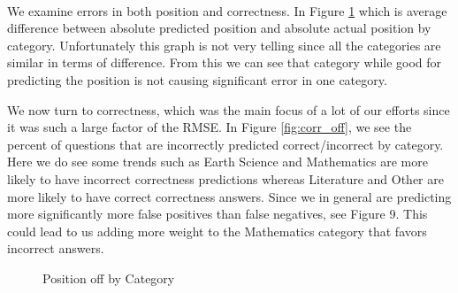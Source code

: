 \documentclass[letterpaper]{article}
\begin{document}
\paragraph{} We examine errors in both position and correctness.  In Figure \ref{fig:abs_off} which is average difference between absolute predicted position and absolute actual position by category.  Unfortunately this graph is not very telling since all the categories are similar in terms of difference.  From this we can see that category while good for predicting the position is not causing significant error in one category.

We now turn to correctness, which was the main focus of a lot of our efforts since it was such a large factor of the RMSE.  In Figure \ref{fig:corr_off}, we see the percent of questions that are incorrectly predicted correct/incorrect by category.  Here we do see some trends such as Earth Science and Mathematics are more likely to have incorrect correctness predictions whereas Literature and Other are more likely to have correct correctness answers.  Since we in general are predicting more significantly more false positives than false negatives, see Figure 9.  This could lead to us adding more weight to the Mathematics category that favors incorrect answers.  



\begin{figure}[H]
	\begin{center}
	\end{center}
	\caption{Position off by Category}
	\label{fig:abs_off}
\end{figure}
\end{document}
